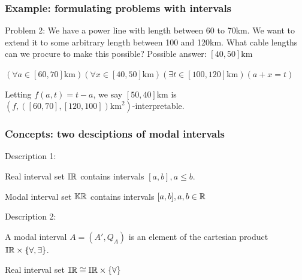 \documentclass{beamer}
\newcommand{\km}{\text{km}}
\begin{document}
\begin{frame}
    \frametitle{Example: formulating problems with intervals}
    
    Problem 2:
    We have a power line with length between 60 to 70km. 
    We want to extend it to some arbitrary length between 100 and 120km.
    What cable lengths can we procure to make this possible?
    Possible answer: $[40, 50]\km$

    \vspace{7mm}
    \par $(\forall a \in [60, 70]\km) (\forall x \in [40, 50]\km) (\exists t \in [100, 120]\km) (a + x = t)$

    \vspace{7mm}
    \par Letting $f(a, t) = t - a$, we say $[50, 40]\km$ is $(f, ([60, 70], [120, 100])\km^2)$-interpretable.

\end{frame}


\begin{frame}
    \frametitle{Concepts: two desciptions of modal intervals}

    Description 1:
    \par Real interval set $\mathbb{IR}$ contains intervals $[a, b], a \leq b$.
    \par Modal interval set $\mathbb{KR}$ contains intervals $[a, b], a, b \in \mathbb R$

    \vspace{7mm}
    Description 2:
    \par A modal interval $A = (A', Q_A)$ is an element of the cartesian product $\mathbb{IR} \times \left\{\forall, \exists\right\}$.
    \par Real interval set $\mathbb{IR} \cong \mathbb{IR} \times \left\{\forall\right\}$

\end{frame}

\end{document}
